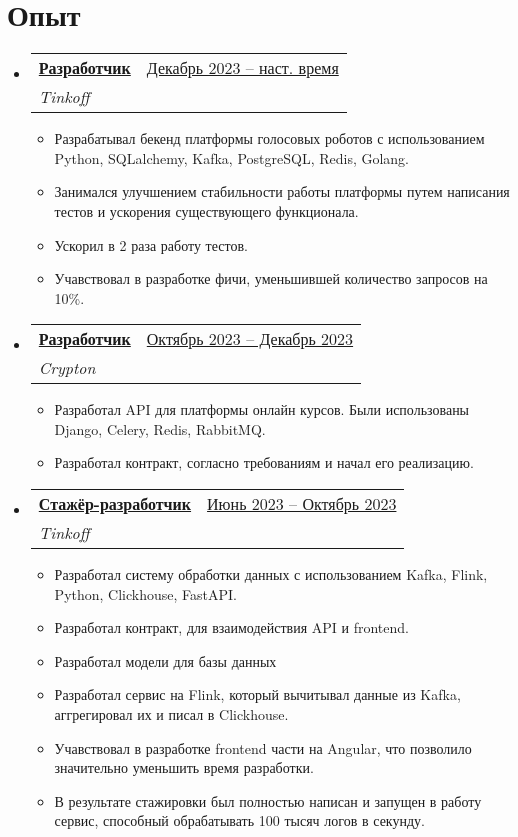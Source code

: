 \documentclass[a4paper,11pt]{article}
\makeatletter
\newcommand{\resumeItem}[1]{
  \item\small{#1}
}
\newcommand{\resumeItemListStart}{\begin{itemize}[rightmargin=0.11in]}
\newcommand{\resumeItemListEnd}{\end{itemize}}
\newcommand{\resumeQuadHeading}[4]{
  \item
  \begin{tabular*}{0.96\textwidth}[t]{l@{\extracolsep{\fill}}r}
    \textbf{#1} & #2 \\
    \textit{\small#3} & \textit{\small #4} \\
  \end{tabular*}
}
\newcommand{\resumeHeadingListStart}{
  \begin{itemize}[leftmargin=0.15in, label={}]
}
\newcommand{\resumeHeadingListEnd}{\end{itemize}}
\makeatother
\begin{document}

\section{Опыт}
\resumeHeadingListStart{}
  \resumeQuadHeading{\underline{Разработчик}}{\underline{Декабрь 2023 -- наст. время}}
  {Tinkoff}{}
    \resumeItemListStart{}
      \resumeItem{Разрабатывал бекенд платформы голосовых роботов с использованием Python, SQLalchemy, Kafka, PostgreSQL, Redis, Golang.}
      \resumeItem{Занимался улучшением стабильности работы платформы путем написания тестов и ускорения существующего функционала.}
      \resumeItem{Ускорил в 2 раза работу тестов.}
      \resumeItem{Учавствовал в разработке фичи, уменьшившей количество запросов на 10\%.}
    \resumeItemListEnd{}
  \resumeQuadHeading{\underline{Разработчик}}{\underline{Октябрь 2023 -- Декабрь 2023}}
  {Crypton}{}
    \resumeItemListStart{}
      \resumeItem{Разработал API для платформы онлайн курсов. Были использованы Django, Celery, Redis, RabbitMQ.}
      \resumeItem{Разработал контракт, согласно требованиям и начал его реализацию.}
    \resumeItemListEnd{}
  \resumeQuadHeading{\underline{Стажёр-разработчик}}{\underline{Июнь 2023 -- Октябрь 2023}}
  {Tinkoff}{}
    \resumeItemListStart{}
      \resumeItem{Разработал систему обработки данных с использованием Kafka, Flink, Python, Clickhouse, FastAPI.}
      \resumeItem{Разработал контракт, для взаимодействия API и frontend.}
      \resumeItem{Разработал модели для базы данных}
      \resumeItem{Разработал сервис на Flink, который вычитывал данные из Kafka, аггрегировал их и писал в Clickhouse.}
      \resumeItem{Учавствовал в разработке frontend части на Angular, что позволило значительно уменьшить время разработки.}
      \resumeItem{В результате стажировки был полностью написан и запущен в работу сервис, способный обрабатывать 100 тысяч логов в секунду.}
    \resumeItemListEnd{}
\resumeHeadingListEnd{}
\end{document}
